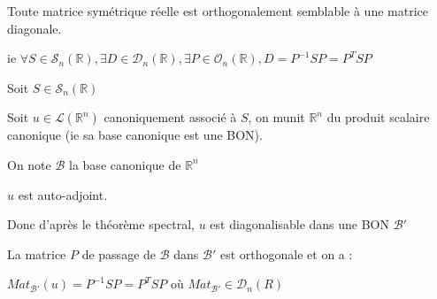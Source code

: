\documentclass[a4paper,12pt]{book}
\newcommand{\Prop}[2]{\begin{tcolorbox}[sharp corners, colback=white,colframe=red!90!black!75, title=Proposition : #1]#2\end{tcolorbox}}
\newcommand{\Pre}[1]{\begin{tcolorbox}[sharp corners, colback=white,colframe=green!60!green!30!black!75, title=Preuve]#1\end{tcolorbox}}
\def\R{\mathbb{R}}
\begin{document}
\Prop{théorème spectral matriciel}{Toute matrice symétrique réelle est orthogonalement semblable à une matrice diagonale.
\par ie $\forall S\in\mathcal{S}_n(\R), \exists D\in\mathcal{D}_n(\R), \exists P\in\mathcal{O}_n(\R), D = P^{-1}SP = P^TSP$}
\Pre{Soit $S\in\mathcal{S}_n(\R)$
\par Soit $u\in\mathcal{L}(\R^n)$ canoniquement associé à $S$, on munit $\R^n$ du produit scalaire canonique (ie sa base canonique est une BON).
\par On note $\mathcal{B}$ la base canonique de $\R^n$
\par $u$ est auto-adjoint.
\par Donc d'après le théorème spectral, $u$ est diagonalisable dans une BON $\mathcal{B}'$
\par La matrice $P$ de passage de $\mathcal{B}$ dans $\mathcal{B}'$ est orthogonale et on a :
\par $Mat_{\mathcal{B}'}(u) = P^{-1}SP = P^TSP$ où $Mat_{\mathcal{B}'}\in\mathcal{D}_n(R)$}
\end{document}
